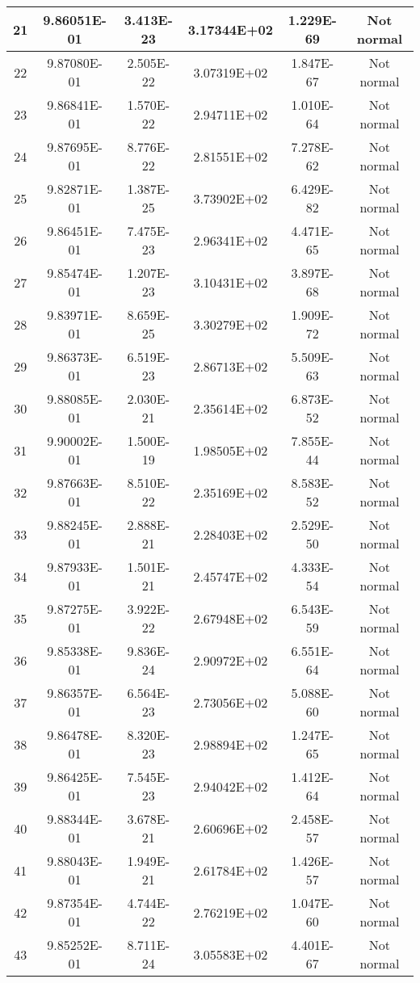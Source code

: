 \begin{table}[h]
\begin{tabular}{|c|c|c|c|c|c|}
		21 & 9.86051E-01 & 3.413E-23 & 3.17344E+02 & 1.229E-69 & Not normal\\\hline
		22 & 9.87080E-01 & 2.505E-22 & 3.07319E+02 & 1.847E-67 & Not normal\\\hline
		23 & 9.86841E-01 & 1.570E-22 & 2.94711E+02 & 1.010E-64 & Not normal\\\hline
		24 & 9.87695E-01 & 8.776E-22 & 2.81551E+02 & 7.278E-62 & Not normal\\\hline
		25 & 9.82871E-01 & 1.387E-25 & 3.73902E+02 & 6.429E-82 & Not normal\\\hline
		26 & 9.86451E-01 & 7.475E-23 & 2.96341E+02 & 4.471E-65 & Not normal\\\hline
		27 & 9.85474E-01 & 1.207E-23 & 3.10431E+02 & 3.897E-68 & Not normal\\\hline
		28 & 9.83971E-01 & 8.659E-25 & 3.30279E+02 & 1.909E-72 & Not normal\\\hline
		29 & 9.86373E-01 & 6.519E-23 & 2.86713E+02 & 5.509E-63 & Not normal\\\hline
		30 & 9.88085E-01 & 2.030E-21 & 2.35614E+02 & 6.873E-52 & Not normal\\\hline
		31 & 9.90002E-01 & 1.500E-19 & 1.98505E+02 & 7.855E-44 & Not normal\\\hline
		32 & 9.87663E-01 & 8.510E-22 & 2.35169E+02 & 8.583E-52 & Not normal\\\hline
		33 & 9.88245E-01 & 2.888E-21 & 2.28403E+02 & 2.529E-50 & Not normal\\\hline
		34 & 9.87933E-01 & 1.501E-21 & 2.45747E+02 & 4.333E-54 & Not normal\\\hline
		35 & 9.87275E-01 & 3.922E-22 & 2.67948E+02 & 6.543E-59 & Not normal\\\hline
		36 & 9.85338E-01 & 9.836E-24 & 2.90972E+02 & 6.551E-64 & Not normal\\\hline
		37 & 9.86357E-01 & 6.564E-23 & 2.73056E+02 & 5.088E-60 & Not normal\\\hline
		38 & 9.86478E-01 & 8.320E-23 & 2.98894E+02 & 1.247E-65 & Not normal\\\hline
		39 & 9.86425E-01 & 7.545E-23 & 2.94042E+02 & 1.412E-64 & Not normal\\\hline
		40 & 9.88344E-01 & 3.678E-21 & 2.60696E+02 & 2.458E-57 & Not normal\\\hline
		41 & 9.88043E-01 & 1.949E-21 & 2.61784E+02 & 1.426E-57 & Not normal\\\hline
		42 & 9.87354E-01 & 4.744E-22 & 2.76219E+02 & 1.047E-60 & Not normal\\\hline
		43 & 9.85252E-01 & 8.711E-24 & 3.05583E+02 & 4.401E-67 & Not normal\\\hline

\end{tabular}
\end{table}
